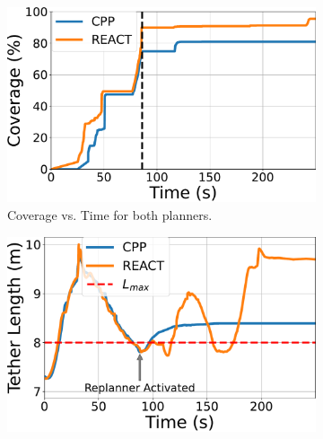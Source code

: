 \begin{table}[ht]
    \centering
    \caption{Coverage Performance in Real-world Trials}
    \label{tab:realworld_coverage}
    \vspace{0.5em}
\end{table}



\begin{figure}[ht]
    \centering
    \begin{subfigure}[b]{0.48\linewidth}
        \centering
        \includegraphics[width=\linewidth]{EA-Planner/figures/dfki_coverage_comparison_plot.pdf}
        \caption{ Coverage vs. Time for both planners.}
        \label{fig:traj_noreact}
    \end{subfigure}
    \hfill
    \begin{subfigure}[b]{0.48\linewidth}
        \centering
        \includegraphics[width=\linewidth]{EA-Planner/figures/dfki_tether_length_vs_time.pdf}

\end{subfigure}
\end{figure}
